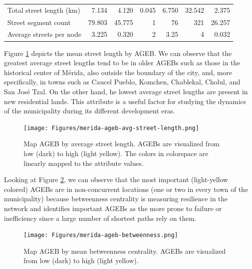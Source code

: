 \begin{landscape}
\begin{table}[htbp]
\begin{tabular}{ l r r r r r r }
    Total street length (km)                         & 7.134           & 4.120           & 0.045            & 6.750           & 32.542          & 2.375      \\
    Street segment count                             & 79.803          & 45.775          & 1           & 76           & 321         & 26.257      \\
    Average streets per node                         & 3.225          & 0.320          & 2          & 3.25          & 4          & 0.032          \\
    \bottomrule
  \end{tabular}
\end{table}
\end{landscape}

Figure \ref{fig:merida-ageb-avg-street-length} depicts the mean street length by AGEB. We can observe that the greatest average street lengths tend to be in older AGEBs such as those in the historical center of Mérida, also outside the boundary of the city, and, more specifically, in towns such as Caucel Pueblo, Komchen, Chablekal, Cholul, and San José Tzal. On the other hand, he lowest average street lengths are present in new residential lands. This attribute is a useful factor for studying the dynamics of the municipality during its different development eras.

\begin{figure}[htpb]
  \centering
  \texttt{[image: Figures/merida-ageb-avg-street-length.png]}
  \caption{Map AGEB by average street length. AGEBs are visualized from low (dark) to high (light yellow). The colors in colorspace are linearly mapped to the attribute values.
    \label{fig:merida-ageb-avg-street-length}}
\end{figure}

Looking at Figure \ref{fig:merida-ageb-betweenness}, we can observe that the most important (light-yellow colored) AGEBs are in non-concurrent locations (one or two in every town of the municipality) because betweenness centrality is measuring resilience in the network and identifies important AGEBs as the more prone to failure or inefficiency since a large number of shortest paths rely on them.

\begin{figure}[htpb]
  \centering
  \texttt{[image: Figures/merida-ageb-betweenness.png]}
  \caption{Map AGEB by mean betweenness centrality. AGEBs are visualized from low (dark) to high (light yellow).
    \label{fig:merida-ageb-betweenness}}
\end{figure}

